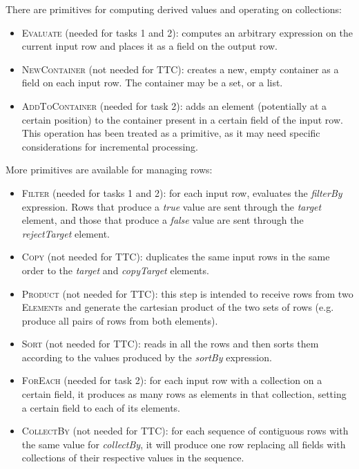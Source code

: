\documentclass[a4paper]{scrartcl}
\newcommand*{\class}[1]{\textsc{#1}}
\begin{document}
There are primitives for computing derived values and operating on
collections:

\begin{itemize}
\item \class{Evaluate} (needed for tasks 1 and 2): computes an
  arbitrary expression on the current input row and places it as a
  field on the output row.

\item \class{NewContainer} (not needed for TTC): creates a new, empty
  container as a field on each input row. The container may be a set,
  or a list.

\item \class{AddToContainer} (needed for task 2): adds an element
  (potentially at a certain position) to the container present in a
  certain field of the input row. This operation has been treated as a
  primitive, as it may need specific considerations for incremental
  processing.
\end{itemize}

More primitives are available for managing rows:

\begin{itemize}
\item \class{Filter} (needed for tasks 1 and 2): for each input row,
  evaluates the \emph{filterBy} expression. Rows that produce a
  \emph{true} value are sent through the \emph{target} element, and
  those that produce a \emph{false} value are sent through the
  \emph{rejectTarget} element.

\item \class{Copy} (not needed for TTC): duplicates the same input
  rows in the same order to the \emph{target} and \emph{copyTarget}
  elements.

\item \class{Product} (not needed for TTC): this step is intended to
  receive rows from two \class{Element}s and generate the cartesian
  product of the two sets of rows (e.g. produce all pairs of rows from
  both elements).

\item \class{Sort} (not needed for TTC): reads in all the rows and
  then sorts them according to the values produced by the
  \emph{sortBy} expression.

\item \class{ForEach} (needed for task 2): for each input row with a
  collection on a certain field, it produces as many rows as elements
  in that collection, setting a certain field to each of its elements.

\item \class{CollectBy} (not needed for TTC): for each sequence of
  contiguous rows with the same value for \emph{collectBy}, it will
  produce one row replacing all fields with collections of their
  respective values in the sequence.
\end{itemize}
\end{document}
